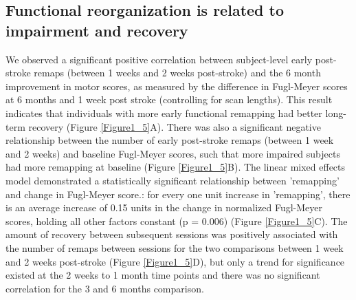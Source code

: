 \documentclass[phd,tocprelim]{cornell}
\begin{document}
	\subsection{Functional reorganization is related to impairment and recovery}
	We observed a significant positive correlation between subject-level early post-stroke remaps (between 1 weeks and 2 weeks post-stroke) and the 6 month improvement in motor scores, as measured by the difference in Fugl-Meyer scores at 6 months and 1 week post stroke (controlling for scan lengths). This result indicates that individuals with more early functional remapping had better long-term recovery (Figure \ref{Figure1_5}A). There was also a significant negative relationship between the number of early post-stroke remaps (between 1 week and 2 weeks) and baseline Fugl-Meyer scores, such that more impaired subjects had more remapping at baseline (Figure \ref{Figure1_5}B). The linear mixed effects model demonstrated a statistically significant relationship between 'remapping' and change in Fugl-Meyer score.: for every one unit increase in 'remapping', there is an average increase of 0.15 units in the change in normalized Fugl-Meyer scores, holding all other factors constant (p = 0.006) (Figure \ref{Figure1_5}C). The amount of recovery between subsequent sessions was  positively associated with the number of remaps between sessions for the two comparisons between 1 week and 2 weeks post-stroke (Figure \ref{Figure1_5}D), but only a trend for significance existed at the 2 weeks to 1 month time points and there was no significant correlation for the 3 and 6 months comparison.
	
\end{document}
